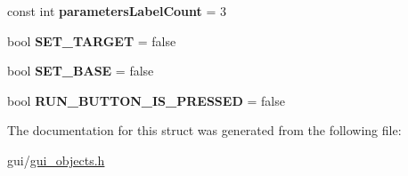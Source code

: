 \begin{DoxyCompactItemize}
\mbox{\label{struct_main_window_objects_a90fb8550521905b8ff5deb3ada029bf6}} 
const int {\bfseries parameters\+Label\+Count} = 3
\item 
\mbox{\label{struct_main_window_objects_a8ecfc11bef148eccb169de602894f430}} 
bool {\bfseries S\+E\+T\+\_\+\+T\+A\+R\+G\+ET} = false
\item 
\mbox{\label{struct_main_window_objects_afd2840313b5e375d9fc611433f881481}} 
bool {\bfseries S\+E\+T\+\_\+\+B\+A\+SE} = false
\item 
\mbox{\label{struct_main_window_objects_a33cf57580a48e05aa26084a2e885c56b}} 
bool {\bfseries R\+U\+N\+\_\+\+B\+U\+T\+T\+O\+N\+\_\+\+I\+S\+\_\+\+P\+R\+E\+S\+S\+ED} = false
\end{DoxyCompactItemize}


The documentation for this struct was generated from the following file\+:\begin{DoxyCompactItemize}
\item 
gui/\hyperlink{gui__objects_8h}{gui\+\_\+objects.\+h}\end{DoxyCompactItemize}
